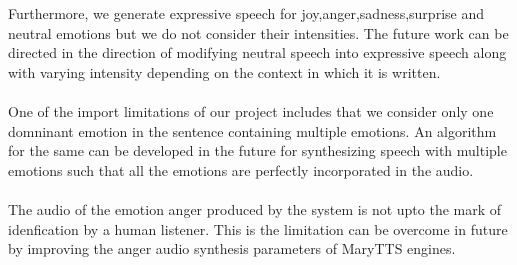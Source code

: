 \documentclass[oneside,a4paper,12pt]{book}
\begin{document}
Furthermore, we generate expressive speech for joy,anger,sadness,surprise and neutral emotions but
we do not consider their intensities. The future work can be directed in the direction of modifying neutral speech into expressive speech along with varying
intensity depending on the context in which it is written.\\\\
One of the import limitations of our project includes that we consider only one domninant emotion in the sentence containing multiple emotions. An algorithm for the same can be developed in the future for synthesizing speech with multiple emotions such that all the emotions are perfectly incorporated in the audio.\\\\
The audio of the emotion anger produced by the system is not upto the mark of idenfication by a human listener. This is the limitation can be overcome in future by improving the anger audio synthesis parameters of MaryTTS engines. 

% 



\end{document}
